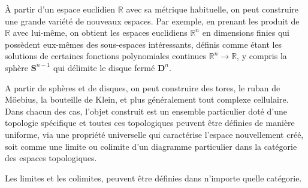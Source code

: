 \documentclass[justified]{tufte-handout}
\def\mbf{\mathbold}
\def\mbbf{\mathbb}
\begin{document}
À partir d'un espace euclidien $\mbbf{R}$ avec sa métrique habituelle, on peut construire une grande variété de nouveaux espaces.
Par exemple, en prenant les produit de $\mbbf{R}$ avec lui-même, on obtient les espaces euclidiens $\mbbf{R}^n$ en dimensions finies qui possèdent eux-mêmes des sous-espaces intéressants, définis comme étant les solutions de certaines fonctions polynomiales continues $\mbbf{R}^n \rightarrow \mbbf{R}$, y compris la sphère $\mbf{S}^{n-1}$ qui délimite le disque fermé $\mbf{D}^n$.

\vspace{5pt}

A partir de sphères et de disques, on peut construire des tores, le ruban de
Möebius, la bouteille de Klein, et plus généralement tout complexe cellulaire.
Dans chacun des cas, l'objet construit est un ensemble particulier doté d'une
topologie spécifique et toutes ces topologiques peuvent être définies de
manière uniforme, via une propriété universelle qui caractérise l'espace
nouvellement créé, soit comme une limite ou colimite d'un diagramme particulier
dans la catégorie des espaces topologiques.

Les limites et les colimites, peuvent être définies dans n'importe quelle
catégorie.
\end{document}
